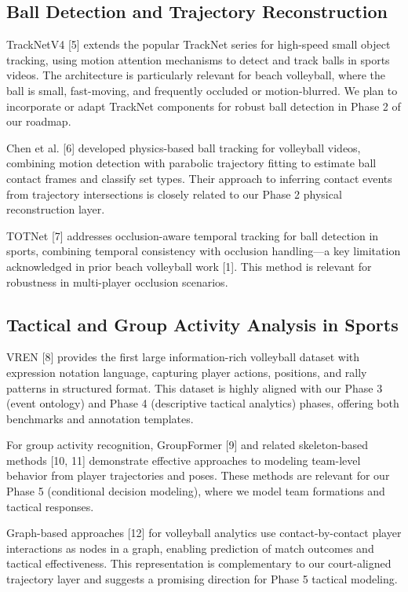 \documentclass[a4paper]{article}
\begin{document}
\subsection{Ball Detection and Trajectory Reconstruction}

TrackNetV4 [5] extends the popular TrackNet series for high-speed small object tracking, using motion attention mechanisms to detect and track balls in sports videos. The architecture is particularly relevant for beach volleyball, where the ball is small, fast-moving, and frequently occluded or motion-blurred. We plan to incorporate or adapt TrackNet components for robust ball detection in Phase 2 of our roadmap.

Chen et al. [6] developed physics-based ball tracking for volleyball videos, combining motion detection with parabolic trajectory fitting to estimate ball contact frames and classify set types. Their approach to inferring contact events from trajectory intersections is closely related to our Phase 2 physical reconstruction layer.

TOTNet [7] addresses occlusion-aware temporal tracking for ball detection in sports, combining temporal consistency with occlusion handling---a key limitation acknowledged in prior beach volleyball work [1]. This method is relevant for robustness in multi-player occlusion scenarios.

\subsection{Tactical and Group Activity Analysis in Sports}

VREN [8] provides the first large information-rich volleyball dataset with expression notation language, capturing player actions, positions, and rally patterns in structured format. This dataset is highly aligned with our Phase 3 (event ontology) and Phase 4 (descriptive tactical analytics) phases, offering both benchmarks and annotation templates.

For group activity recognition, GroupFormer [9] and related skeleton-based methods [10, 11] demonstrate effective approaches to modeling team-level behavior from player trajectories and poses. These methods are relevant for our Phase 5 (conditional decision modeling), where we model team formations and tactical responses.

Graph-based approaches [12] for volleyball analytics use contact-by-contact player interactions as nodes in a graph, enabling prediction of match outcomes and tactical effectiveness. This representation is complementary to our court-aligned trajectory layer and suggests a promising direction for Phase 5 tactical modeling.
\end{document}
